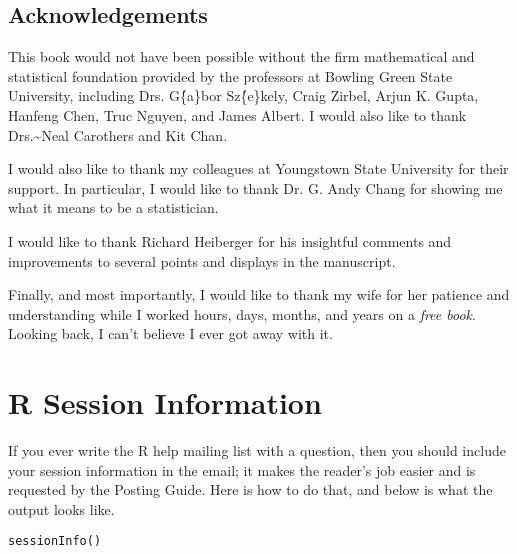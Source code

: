 \documentclass[captions=tableheading]{scrbook}
\begin{document}
\section*{Acknowledgements}

This book would not have been possible without the firm mathematical and statistical foundation provided by the professors at Bowling Green State University, including Drs. G\'\{a\}bor Sz\'\{e\}kely, Craig Zirbel, Arjun K. Gupta, Hanfeng Chen, Truc Nguyen, and James Albert. I would also like to thank Drs.\~{}Neal Carothers and Kit Chan. 

I would also like to thank my colleagues at Youngstown State University for their support. In particular, I would like to thank Dr. G. Andy Chang for showing me what it means to be a statistician.

I would like to thank Richard Heiberger for his insightful comments and improvements to several points and displays in the manuscript. 

Finally, and most importantly, I would like to thank my wife for her patience and understanding while I worked hours, days, months, and years on a \emph{free book}. Looking back, I can't believe I ever got away with it.

\vfill{}
\cleardoublepage
{}
{}
\listoffigures

\vfill{}
\cleardoublepage
{}
{}
\listoftables





\appendix
\chapter{\textsf{R} Session Information}
\label{sec-2}

\label{cha:R-Session-Information}

If you ever write the \textsf{R} help mailing list with a question, then you should include your session information in the email; it makes the reader's job easier and is requested by the Posting Guide. Here is how to do that, and below is what the output looks like.


\begin{verbatim}
sessionInfo()
\end{verbatim}
\end{document}
